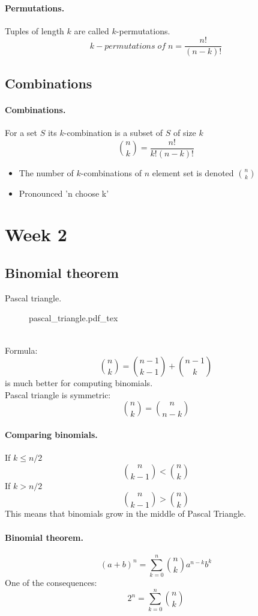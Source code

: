 \documentclass{article}
\newcommand{\incfig}[2][1]{%
    \def\svgwidth{#1\columnwidth}
    {#2.pdf_tex}
}
\begin{document}
\paragraph{Permutations.}
Tuples of length $k$ are called $k$-permutations.
\[
k-permutations \; of \; n = \frac{n!}{(n-k)!}
\]

\subsection{Combinations}
\paragraph{Combinations.}
For a set $S$ its $k$-combination is a subset of $S$ of size $k$
\[
{n \choose k} = \frac{n!}{k!(n-k)!}
\]
\begin{itemize}
  \item The number of $k$-combinations of $n$ element set is denoted $n \choose k$
  \item Pronounced 'n choose k'
\end{itemize}

\newpage

\section{Week 2}

\subsection{Binomial theorem}

Pascal triangle.
\begin{figure}[h!]
  \centering
  \incfig{pascal_triangle}
\end{figure}
\\
Formula:
\[
{n \choose k} = {n-1 \choose k-1} + {n-1 \choose k}
\]
is much better for computing binomials.
\\
Pascal triangle is symmetric:
\[
{n \choose k} = {n \choose n-k}
\]

\paragraph{Comparing binomials.}
If $k \leq n/2$
\[
{n \choose k-1} < {n \choose k}
\]
If $k > n/2$
\[
{n \choose k-1} > {n \choose k}
\]
This means that binomials grow in the middle of Pascal Triangle.

\paragraph{Binomial theorem.}
\[
(a+b)^n = \sum_{k=0}^{n} {n \choose k} a ^{n-k} b^k
\]
One of the consequences:
\[
2^n = \sum_{k=0}^{n} {n \choose k}
\]
\end{document}
